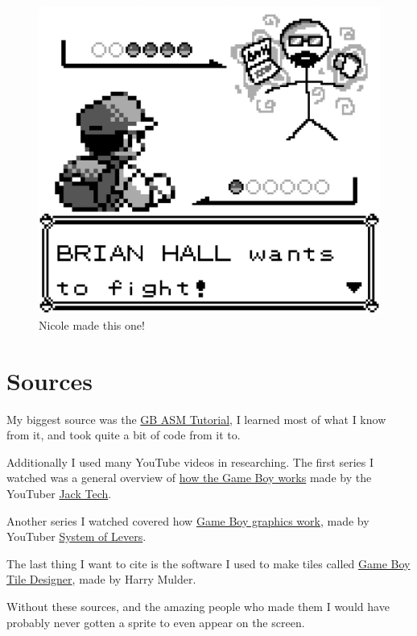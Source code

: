 \documentclass{article}
\begin{document}
\begin{figure}[htp]
    \centering
    \includegraphics[width=12cm]{images/brianhallwantstofight.png}
    \caption{Nicole made this one!}
    \label{FIGHT}
\end{figure}


\section{Sources}

My biggest source was the \href{https://gbdev.io/gb-asm-tutorial/index.html}{GB ASM Tutorial}, I learned most of what I know from it, and took quite a bit of code from it to. 

Additionally I used many YouTube videos in researching. The first series I watched was a general overview of \href{https://www.youtube.com/watch?v=RZUDEaLa5Nw}{how the Game Boy works} made by the YouTuber \href{https://www.youtube.com/@jacktech5101}{Jack Tech}. 

Another series I watched covered how \href{https://www.youtube.com/watch?v=txkHN6izK2Y&t=122s}{Game Boy graphics work}, made by YouTuber \href{https://www.youtube.com/@systemoflevers/videos}{System of Levers}.

The last thing I want to cite is the software I used to make tiles called \href{http://www.devrs.com/gb/hmgd/gbtd.html}{Game Boy Tile Designer}, made by Harry Mulder.

Without these sources, and the amazing people who made them I would have probably never gotten a sprite to even appear on the screen.
\end{document}
